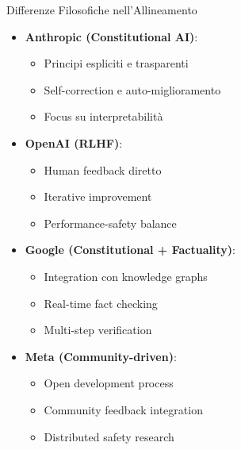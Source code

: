 \documentclass[aspectratio=169]{beamer}
\begin{document}
\begin{frame}{Differenze Filosofiche nell'Allineamento}
\begin{itemize}
    \item \textbf{Anthropic (Constitutional AI)}:
    \begin{itemize}
        \item Principi espliciti e trasparenti
        \item Self-correction e auto-miglioramento
        \item Focus su interpretabilità
    \end{itemize}
    
    \item \textbf{OpenAI (RLHF)}:
    \begin{itemize}
        \item Human feedback diretto
        \item Iterative improvement
        \item Performance-safety balance
    \end{itemize}
    
    \item \textbf{Google (Constitutional + Factuality)}:
    \begin{itemize}
        \item Integration con knowledge graphs
        \item Real-time fact checking
        \item Multi-step verification
    \end{itemize}
    
    \item \textbf{Meta (Community-driven)}:
    \begin{itemize}
        \item Open development process
        \item Community feedback integration
        \item Distributed safety research
    \end{itemize}
\end{itemize}
\end{frame}
%
%
\end{document}
